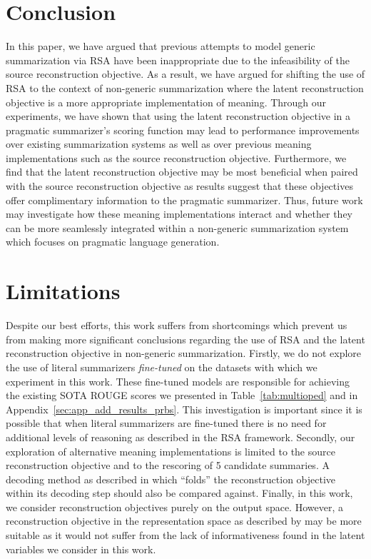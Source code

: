 \documentclass[11pt]{article}
\begin{document}
\section{Conclusion}

In this paper, we have argued that previous attempts to model generic summarization via RSA have been inappropriate due to the infeasibility of the source reconstruction objective. As a result, we have argued for shifting the use of RSA to the context of non-generic summarization where the latent reconstruction objective is a more appropriate implementation of meaning. Through our experiments, we have shown that using the latent reconstruction objective in a pragmatic summarizer's scoring function may lead to performance improvements over existing summarization systems as well as over previous meaning implementations such as the source reconstruction objective. Furthermore, we find that the latent reconstruction objective may be most beneficial when paired with the source reconstruction objective as results suggest that these objectives offer complimentary information to the pragmatic summarizer. Thus, future work may investigate how these meaning implementations interact and whether they can be more seamlessly integrated within a non-generic summarization system which focuses on pragmatic language generation.

\section*{Limitations}

Despite our best efforts, this work suffers from shortcomings which prevent us from making more significant conclusions regarding the use of RSA and the latent reconstruction objective in non-generic summarization. Firstly, we do not explore the use of literal summarizers \emph{fine-tuned} on the datasets with which we experiment in this work. These fine-tuned models are responsible for achieving the existing SOTA ROUGE scores we presented in Table~\ref{tab:multioped} and in Appendix~\ref{sec:app_add_results_prbs}. This investigation is important since it is possible that when literal summarizers are fine-tuned there is no need for additional levels of reasoning as described in the RSA framework. Secondly, our exploration of alternative meaning implementations is limited to the source reconstruction objective and to the rescoring of 5 candidate summaries. A decoding method as described in \citet{cohn-gordonPragmaticallyInformativeImage2018a} which ``folds'' the reconstruction objective within its decoding step should also be compared against. Finally, in this work, we consider reconstruction objectives purely on the output space. However, a reconstruction objective in the representation space as described by \citet{assran2023selfsupervised} may be more suitable as it would not suffer from the lack of informativeness found in the latent variables we consider in this work.
\end{document}
